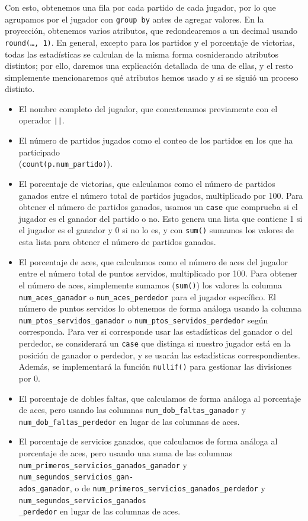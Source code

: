 \documentclass[11pt]{opticajnl}
\begin{document}
Con esto, obtenemos una fila por cada partido de cada jugador, por lo que agrupamos por el jugador con \texttt{group by} antes de agregar valores. En la proyección, obtenemos varios atributos, que redondearemos a un decimal usando \texttt{round(\dots, 1)}. En general, excepto para los partidos y el porcentaje de victorias, todas las estadísticas se calculan de la misma forma cosniderando atributos distintos; por ello, daremos una explicación detallada de una de ellas, y el resto simplemente mencionaremos qué atributos hemos usado y si se siguió un proceso distinto.
\begin{itemize}
\item El nombre completo del jugador, que concatenamos previamente con el operador \texttt{||}.
\item El número de partidos jugados como el conteo de los partidos en los que ha participado \\ (\texttt{count(p.num\_partido)}).
\item El porcentaje de victorias, que calculamos como el número de partidos ganados entre el número total de partidos jugados, multiplicado por 100. Para obtener el número de partidos ganados, usamos un \texttt{case} que comprueba si el jugador es el ganador del partido o no. Esto genera una lista que contiene 1 si el jugador es el ganador y 0 si no lo es, y con \texttt{sum()} sumamos los valores de esta lista para obtener el número de partidos ganados. 
\item El porcentaje de aces, que calculamos como el número de aces del jugador entre el número total de puntos servidos, multiplicado por 100. Para obtener el número de aces, simplemente sumamos (\texttt{sum()}) los valores la columna \texttt{num\_aces\_ganador} o \texttt{num\_aces\_perdedor} para el jugador específico. El número de puntos servidos lo obtenemos de forma análoga usando la columna \texttt{num\_ptos\_servidos\_ganador} o \texttt{num\_ptos\_servidos\_perdedor} según corresponda. Para ver si corresponde usar las estadísticas del ganador o del perdedor, se considerará un \texttt{case} que distinga si nuestro jugador está en la posición de ganador o perdedor, y se usarán las estadísticas correspondientes. Además, se implementará la función \texttt{nullif()} para gestionar las divisiones por 0. 
\item El porcentaje de dobles faltas, que calculamos de forma análoga al porcentaje de aces, pero usando las columnas \texttt{num\_dob\_faltas\_ganador} y \texttt{num\_dob\_faltas\_perdedor} en lugar de las columnas de aces. 
\item El porcentaje de servicios ganados, que calculamos de forma análoga al porcentaje de aces, pero usando una suma de las columnas \texttt{num\_primeros\_servicios\_ganados\_ganador} y \texttt{num\_segundos\_servicios\_gan-}\\\texttt{ados\_ganador}, o de \texttt{num\_primeros\_servicios\_ganados\_perdedor} y \texttt{num\_segundos\_servicios\_ganados}\\\texttt{\_perdedor} en lugar de las columnas de aces.

\end{itemize}
\end{document}
